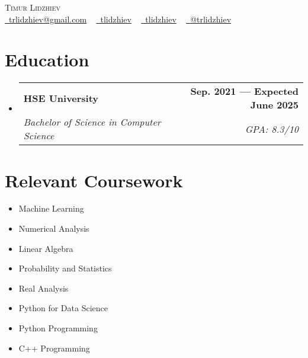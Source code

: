 \documentclass[letterpaper,11pt]{article}
\makeatletter
\newcommand{\resumeSubheading}[4]{
  \vspace{-2pt}\item
    \begin{tabular*}{1.0\textwidth}[t]{l@{\extracolsep{\fill}}r}
      \textbf{#1} & \textbf{\small #2} \\
      \textit{\small#3} & \textit{\small #4} \\
    \end{tabular*}\vspace{-7pt}
}
\newcommand{\resumeSubHeadingListStart}{\begin{itemize}[leftmargin=0.0in, label={}]}
\newcommand{\resumeSubHeadingListEnd}{\end{itemize}}
\makeatother
\begin{document}

\begin{center}
    {\Huge \scshape Timur Lidzhiev} \\ \vspace{1pt}
     \href{mailto:x@gmail.com}{\raisebox{-0.2\height}\faEnvelope\  trlidzhiev@gmail.com} ~
    \href{https://linkedin.com/in/tlidzhiev}{\raisebox{-0.2\height}\faLinkedin\ tlidzhiev}  ~
    \href{https://github.com/tlidzhiev}{\raisebox{-0.2\height}\faGithub\ tlidzhiev} ~ \href{https://t.me/trlidzhiev}{\raisebox{-0.05\height}\faTelegram \ @trlidzhiev}
    \vspace{-8pt}
\end{center}


\section{Education}
  \resumeSubHeadingListStart
    \resumeSubheading
      {HSE University}{Sep. 2021 --- Expected June 2025}
      {Bachelor of Science in Computer Science}{GPA: 8.3/10}
  \resumeSubHeadingListEnd

\section{Relevant Coursework}
        \begin{multicols}{4}
            \begin{itemize}[itemsep=-5pt, parsep=3pt]
                \item Machine Learning
                \item Numerical Analysis
                \item Linear Algebra
                \item\small Probability and Statistics
                \item Real Analysis
                \item\small Python for Data Science
                \item Python Programming
                \item C++ Programming
            \end{itemize}
        \end{multicols}
        \vspace*{2.0\multicolsep}
\end{document}
